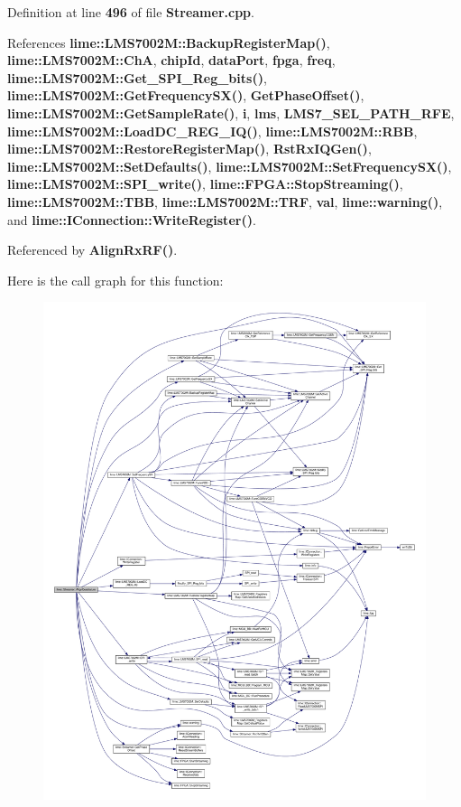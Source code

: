 Definition at line {\bf 496} of file {\bf Streamer.\+cpp}.



References {\bf lime\+::\+L\+M\+S7002\+M\+::\+Backup\+Register\+Map()}, {\bf lime\+::\+L\+M\+S7002\+M\+::\+ChA}, {\bf chip\+Id}, {\bf data\+Port}, {\bf fpga}, {\bf freq}, {\bf lime\+::\+L\+M\+S7002\+M\+::\+Get\+\_\+\+S\+P\+I\+\_\+\+Reg\+\_\+bits()}, {\bf lime\+::\+L\+M\+S7002\+M\+::\+Get\+Frequency\+S\+X()}, {\bf Get\+Phase\+Offset()}, {\bf lime\+::\+L\+M\+S7002\+M\+::\+Get\+Sample\+Rate()}, {\bf i}, {\bf lms}, {\bf L\+M\+S7\+\_\+\+S\+E\+L\+\_\+\+P\+A\+T\+H\+\_\+\+R\+FE}, {\bf lime\+::\+L\+M\+S7002\+M\+::\+Load\+D\+C\+\_\+\+R\+E\+G\+\_\+\+I\+Q()}, {\bf lime\+::\+L\+M\+S7002\+M\+::\+R\+BB}, {\bf lime\+::\+L\+M\+S7002\+M\+::\+Restore\+Register\+Map()}, {\bf Rst\+Rx\+I\+Q\+Gen()}, {\bf lime\+::\+L\+M\+S7002\+M\+::\+Set\+Defaults()}, {\bf lime\+::\+L\+M\+S7002\+M\+::\+Set\+Frequency\+S\+X()}, {\bf lime\+::\+L\+M\+S7002\+M\+::\+S\+P\+I\+\_\+write()}, {\bf lime\+::\+F\+P\+G\+A\+::\+Stop\+Streaming()}, {\bf lime\+::\+L\+M\+S7002\+M\+::\+T\+BB}, {\bf lime\+::\+L\+M\+S7002\+M\+::\+T\+RF}, {\bf val}, {\bf lime\+::warning()}, and {\bf lime\+::\+I\+Connection\+::\+Write\+Register()}.



Referenced by {\bf Align\+Rx\+R\+F()}.



Here is the call graph for this function\+:
\nopagebreak
\begin{figure}[H]
\begin{center}
\leavevmode
\includegraphics[width=350pt]{d9/d5d/classlime_1_1Streamer_a44a390ff3b22aabf1c112ba0f13a9e7f_cgraph}
\end{center}
\end{figure}




